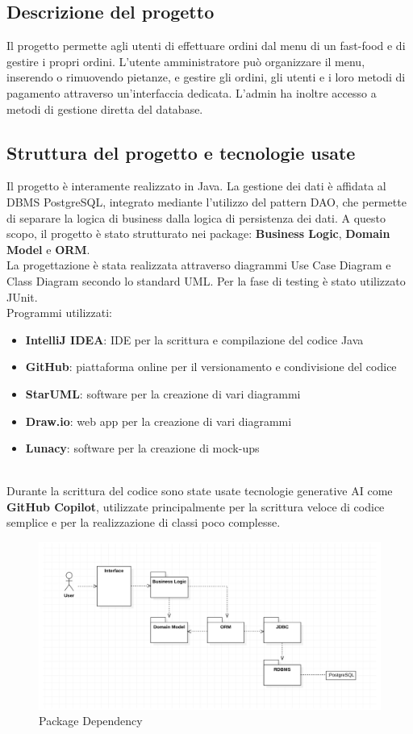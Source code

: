 \documentclass{article}
\begin{document}
\subsection{Descrizione del progetto}
Il progetto permette agli utenti di effettuare ordini dal menu di un fast-food e di gestire i propri ordini. L'utente amministratore può organizzare il menu, inserendo o rimuovendo pietanze, e gestire gli ordini, gli utenti e i loro metodi di pagamento attraverso un'interfaccia dedicata. L'admin ha inoltre accesso a metodi di gestione diretta del database.


\subsection{Struttura del progetto e tecnologie usate}
Il progetto è interamente realizzato in Java. La gestione dei dati è affidata al DBMS PostgreSQL, integrato mediante l'utilizzo del pattern DAO, che permette di separare la logica di business dalla logica di persistenza dei dati. A questo scopo, il progetto è stato strutturato nei package: \textbf{Business Logic}, \textbf{Domain Model} e \textbf{ORM}.\\ La progettazione è stata realizzata attraverso diagrammi Use Case Diagram e Class Diagram secondo lo standard UML. Per la fase di testing è stato utilizzato JUnit. \\
Programmi utilizzati:
\begin{itemize}
    \item {\textbf{IntelliJ IDEA}}: IDE per la scrittura e compilazione del codice Java
    \item {\textbf{GitHub}}: piattaforma online per il versionamento e condivisione del codice
    \item {\textbf{StarUML}}: software per la creazione di vari diagrammi
    \item {\textbf{Draw.io}}: web app per la creazione di vari diagrammi
    \item {\textbf{Lunacy}}: software per la creazione di mock-ups
\end{itemize}
\\
Durante la scrittura del codice sono state usate tecnologie generative AI come \textbf{GitHub Copilot}, utilizzate principalmente per la scrittura veloce di codice semplice e per la realizzazione di classi poco complesse. \\

\begin{figure}[!h]
    \centering
    \includegraphics[width=0.9\linewidth]{imgs/PackageDependecy.png}
    \caption{Package Dependency}
    \label{PackageDependecy}
\end{figure}
\end{document}
